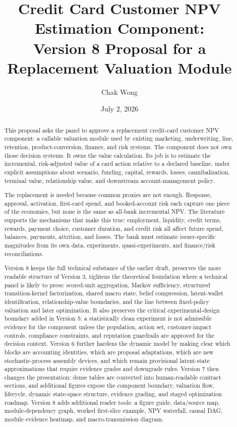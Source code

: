 \documentclass[11pt]{article}
\title{Credit Card Customer NPV Estimation Component:\\
Version 8 Proposal for a Replacement Valuation Module}
\author{Chak Wong}
\date{July 2, 2026}
\newcommand{\1}{\mathbf{1}}
\begin{document}
\maketitle

\begin{abstract}
This proposal asks the panel to approve a replacement credit-card customer NPV
component: a callable valuation module used by existing marketing,
underwriting, line, retention, product-conversion, finance, and risk systems.
The component does not own those decision systems. It owns the value
calculation. Its job is to estimate the incremental, risk-adjusted value of a
card action relative to a declared baseline, under explicit assumptions about
scenario, funding, capital, rewards, losses, cannibalization, terminal value,
relationship value, and downstream account-management policy.

The replacement is needed because common proxies are not enough. Response,
approval, activation, first-card spend, and booked-account risk each capture
one piece of the economics, but none is the same as all-bank incremental NPV.
The literature supports the mechanisms that make this true: employment,
liquidity, credit terms, rewards, payment choice, customer duration, and credit
risk all affect future spend, balances, payments, attrition, and losses. The
bank must estimate issuer-specific magnitudes from its own data, experiments,
quasi-experiments, and finance/risk reconciliations.

Version 8 keeps the full technical substance of the earlier draft, preserves
the more readable structure of Version 3, tightens the theoretical
foundation where a technical panel is likely to press: scored-unit aggregation,
Markov sufficiency, structured transition-kernel factorization, shared macro
state, belief compression, latent-wallet identification, relationship-value
boundaries, and the line between fixed-policy valuation and later optimization.
It also preserves the critical experimental-design boundary added in Version 5:
a statistically clean
experiment is not admissible evidence for the component unless the population,
action set, customer-impact controls, compliance constraints, and reputation
guardrails are approved for the decision context. Version 6 further hardens the
dynamic model by making clear which blocks are accounting identities, which are
proposal adaptations, which are new stochastic-process assembly devices, and
which remain provisional latent-state approximations that require evidence
grades and downgrade rules. Version 7 then changes the presentation: dense
tables are converted into human-readable contract sections, and additional
figures expose the component boundary, valuation flow, lifecycle, dynamic
state-space structure, evidence grading, and staged optimization roadmap.
Version 8 adds additional reader tools: a figure guide, data/source map,
module-dependency graph, worked first-slice example, NPV waterfall, causal DAG,
module evidence heatmap, and macro-transmission diagram.
\end{abstract}
\end{document}
